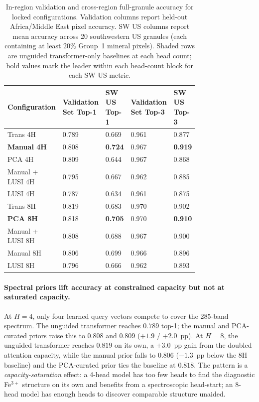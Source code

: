 \documentclass[11pt]{article}
\begin{document}
\begin{table}[!htbp]
\centering
\small
\caption{In-region validation and cross-region full-granule accuracy for locked configurations. 
Validation columns report held-out Africa/Middle East pixel accuracy. 
SW US columns report mean accuracy across 20 southwestern US granules (each containing at least $20\%$ Group~1 mineral pixels). 
Shaded rows are unguided transformer-only baselines at each head count; bold values mark the leader within each head-count block for each SW US metric.}
\label{tab:crossscene}
\begin{tabular}{p{0.2\linewidth}p{0.13\linewidth}p{0.15\linewidth}p{0.13\linewidth}p{0.15\linewidth}}
\hline
\rowcolor[gray]{0.85}
\textbf{Configuration} & \textbf{Validation Set Top-1} & \textbf{SW US Top-1} & \textbf{Validation Set Top-3} & \textbf{SW US Top-3} \\
\hline
\rowcolor{pink!30}
Trans 4H & 0.789 & 0.669 & 0.961 & 0.877 \\
\hline
\textbf{Manual 4H} & 0.808 & \textbf{0.724} & 0.967 & \textbf{0.919} \\
\hline
PCA 4H & 0.809 & 0.644 & 0.967 & 0.868 \\
\hline
Manual + LUSI 4H & 0.795 & 0.667 & 0.962 & 0.885 \\
\hline
LUSI 4H & 0.787 & 0.634 & 0.961 & 0.875 \\
\hline
\rowcolor{pink!30}
Trans 8H & 0.819 & 0.683 & 0.970 & 0.902 \\
\hline
\textbf{PCA 8H} & 0.818 & \textbf{0.705} & 0.970 & \textbf{0.910} \\
\hline
Manual + LUSI 8H & 0.808 & 0.688 & 0.967 & 0.900 \\
\hline
Manual 8H & 0.806 & 0.699 & 0.966 & 0.896 \\
\hline
LUSI 8H & 0.796 & 0.666 & 0.962 & 0.893 \\
\hline

\end{tabular}
\end{table}

\paragraph{Spectral priors lift accuracy at constrained capacity but not at saturated capacity.}
At $H = 4$, only four learned query vectors compete to cover the 285-band spectrum.
The unguided transformer reaches $0.789$ top-1; the manual and PCA-curated priors raise this to $0.808$ and $0.809$ ($+1.9$ / $+2.0$~pp).
At $H = 8$, the unguided transformer reaches $0.819$ on its own, a $+3.0$~pp gain from the doubled attention capacity, while the manual prior falls to $0.806$ ($-1.3$~pp below the 8H baseline) and the PCA-curated prior ties the baseline at $0.818$.
The pattern is a \emph{capacity-saturation} effect: a 4-head model has too few heads to find the diagnostic Fe$^{3+}$ structure on its own and benefits from a spectroscopic head-start; an 8-head model has enough heads to discover comparable structure unaided.
\end{document}
